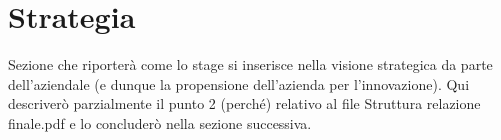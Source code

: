 \section{Strategia}%

Sezione che riporterà come lo stage si inserisce nella visione strategica da parte dell'aziendale (e dunque la  propensione dell’azienda per l’innovazione).
Qui descriverò parzialmente il punto 2 (perché) relativo al file Struttura relazione finale.pdf e lo concluderò nella sezione successiva.
